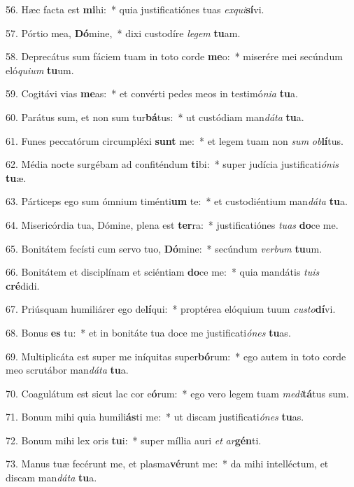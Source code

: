 56. Hæc facta est \textbf{mi}hi:~*  quia justificatiónes tuas \textit{ex}\textit{qui}\textbf{sí}vi.\

57. Pórtio mea, \textbf{Dó}mine,~*  dixi custodíre \textit{le}\textit{gem} \textbf{tu}am.\

58. Deprecátus sum fáciem tuam in toto corde \textbf{me}o:~*  miserére mei secúndum eló\textit{qui}\textit{um} \textbf{tu}um.\

59. Cogitávi vias \textbf{me}as:~*  et convérti pedes meos in testimó\textit{ni}\textit{a} \textbf{tu}a.\

60. Parátus sum, et non sum tur\textbf{bá}tus:~*  ut custódiam man\textit{dá}\textit{ta} \textbf{tu}a.\

61. Funes peccatórum circumpléxi \textbf{sunt} me:~*  et legem tuam non \textit{sum} \textit{ob}\textbf{lí}tus.\

62. Média nocte surgébam ad confiténdum \textbf{ti}bi:~*  super judícia justificati\textit{ó}\textit{nis} \textbf{tu}æ.\

63. Párticeps ego sum ómnium timénti\textbf{um} te:~*  et custodiéntium man\textit{dá}\textit{ta} \textbf{tu}a.\

64. Misericórdia tua, Dómine, plena est \textbf{ter}ra:~*  justificatiónes \textit{tu}\textit{as} \textbf{do}ce me.\

65. Bonitátem fecísti cum servo tuo, \textbf{Dó}mine:~*  secúndum \textit{ver}\textit{bum} \textbf{tu}um.\

66. Bonitátem et disciplínam et sciéntiam \textbf{do}ce me:~*  quia mandátis \textit{tu}\textit{is} \textbf{cré}didi.\

67. Priúsquam humiliárer ego de\textbf{lí}qui:~*  proptérea elóquium tuum \textit{cus}\textit{to}\textbf{dí}vi.\

68. Bonus \textbf{es} tu:~*  et in bonitáte tua doce me justificati\textit{ó}\textit{nes} \textbf{tu}as.\

69. Multiplicáta est super me iníquitas super\textbf{bó}rum:~*  ego autem in toto corde meo scrutábor man\textit{dá}\textit{ta} \textbf{tu}a.\

70. Coagulátum est sicut lac cor e\textbf{ó}rum:~*  ego vero legem tuam \textit{me}\textit{di}\textbf{tá}tus sum.\

71. Bonum mihi quia humili\textbf{ás}ti me:~*  ut discam justificati\textit{ó}\textit{nes} \textbf{tu}as.\

72. Bonum mihi lex oris \textbf{tu}i:~*  super míllia auri \textit{et} \textit{ar}\textbf{gén}ti.\

73. Manus tuæ fecérunt me, et plasma\textbf{vé}runt me:~*  da mihi intelléctum, et discam man\textit{dá}\textit{ta} \textbf{tu}a.\


